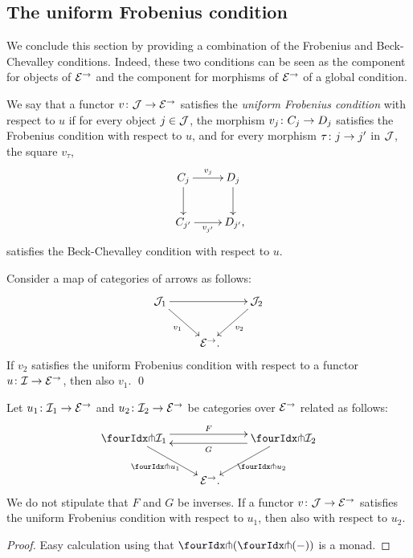 \documentclass[reqno,10pt,a4paper,oneside,draft]{amsart}
\begin{document}
\subsection*{The uniform Frobenius condition}

We conclude this section by providing a combination of the Frobenius and Beck-Chevalley conditions.
Indeed, these two conditions can be seen as the component for objects of $\catE^\to$ and the component for morphisms of $\catE^\to$ of a global condition.

\begin{definition} \label{def:uniFrobcond}
We say that a functor $v \co \cal{J} \to \catE^\to$ satisfies the \emph{uniform Frobenius condition} with respect to $u$ if for every object $j \in \cal{J}$, the morphism $v_j \co C_j \to D_j$ satisfies the Frobenius condition with respect to $u$, and for every morphism $\tau \co j \to j'$ in $\cal{J}$, the square $v_\tau$,
\[
\xymatrix{
  C_j
  \ar[r]^{v_j}
  \ar[d]
&
  D_j
  \ar[d]
\\
  C_{j'}
  \ar[r]_-{v_{j'}}
&
  D_{j'}
\rlap{,}}
\]
satisfies the Beck-Chevalley condition with respect to $u$.
\end{definition}

\begin{proposition} \label{uniform-frobenius-change-v}
Consider a map of categories of arrows as follows:
\[
\xymatrix{
  \cal{J}_1
  \ar[rr]
  \ar[dr]_{v_1}
&&
  \cal{J}_2
  \ar[dl]^{v_2}
\\&
  \catE^\to
\rlap{.}}
\]
If $v_2$ satisfies the uniform Frobenius condition with respect to a functor $u \co \cal{I} \to \catE^\to$, then also $v_1$.
\qed
\end{proposition}

\begin{proposition} \label{uniform-frobenius-change-u}
Let $u_1 \co \cal{I}_1 \to \catE^\to$ and $u_2 \co \cal{I}_2 \to \catE^\to$ be categories over $\catE^\to$ related as follows:
\[
\xymatrix{
  \liftr{\cal{I}_1}
  \ar@<4pt>[rr]^{F}
  \ar[dr]_{\liftr{u_1}}
&&
  \liftr{\cal{I}_2}
  \ar@<4pt>[ll]^{G}
  \ar[dl]^{\liftr{u_2}}
\\&
  \catE^\to
\rlap{.}}
\]
We do not stipulate that $F$ and $G$ be inverses.
If a functor $v \co \cal{J} \to \catE^\to$ satisfies the uniform Frobenius condition with respect to $u_1$, then also with respect to $u_2$.
\end{proposition}

\begin{proof}
Easy calculation using that $\liftl{(\liftr{(-)})}$ is a monad.
\end{proof}
\end{document}
